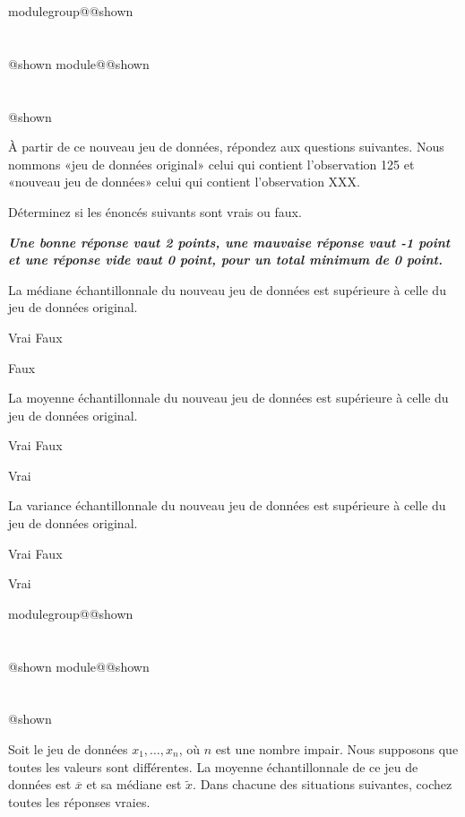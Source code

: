 \documentclass{Evaluation}
\makeatletter
\newcommand{\currentmodulekey}{}
\newcommand{\currentmoduletitle}{}
\newcommand{\currentgroupkey}{}
\newcommand{\currentgrouptitle}{}
\newcommand{\showmoduleifneeded}{%
  \ifx\currentgroupkey\empty\else
    \expandafter\ifx\csname modulegroup@\currentgroupkey @shown\endcsname\relax
      \section*{\currentgrouptitle}%
      \expandafter\gdef\csname modulegroup@\currentgroupkey @shown\endcsname{1}%
    \fi
  \fi
  \expandafter\ifx\csname module@\currentmodulekey @shown\endcsname\relax
    \section*{\currentmoduletitle}%
    \expandafter\gdef\csname module@\currentmodulekey @shown\endcsname{1}%
  \fi
}
\newenvironment{H24}{\showmoduleifneeded}{}
\newenvironment{A24}{\showmoduleifneeded}{}
\makeatother
\begin{document}
\begin{questions}
\begin{H24}
\begin{parts}
À partir de ce nouveau jeu de données, répondez aux questions suivantes. Nous nommons «jeu de données original» celui qui contient l'observation 125 et «nouveau jeu de données» celui qui contient l'observation XXX.

Déterminez si les énoncés suivants sont vrais ou faux.

\textbf{\textit{Une bonne réponse vaut 2 points, une mauvaise réponse vaut -1 point et une réponse vide vaut 0 point, pour un total minimum de 0 point.}}

\begin{subparts}
\subpart La médiane échantillonnale du nouveau jeu de données est supérieure à celle du jeu de données original.

    \begin{oneparcheckboxes}
        \choice Vrai
        \correctchoice Faux
    \end{oneparcheckboxes}

\begin{solution}
    Faux
\end{solution}

\subpart La moyenne échantillonnale du nouveau jeu de données est supérieure à celle du jeu de données original.

    \begin{oneparcheckboxes}
        \correctchoice Vrai
        \choice Faux
    \end{oneparcheckboxes}

\begin{solution}
    Vrai
\end{solution}

\subpart La variance échantillonnale du nouveau jeu de données est supérieure à celle du jeu de données original.

    \begin{oneparcheckboxes}
        \correctchoice Vrai
        \choice Faux
    \end{oneparcheckboxes}

\begin{solution}
    Vrai
\end{solution}

\end{subparts}
\end{parts}
\end{H24}

\begin{A24}
\question {} %
Soit le jeu de données $x_1,\hdots,x_n$, où $n$ est une nombre impair. Nous supposons que toutes les valeurs sont différentes. La moyenne échantillonnale de ce jeu de données est $\overline{x}$ et sa médiane est $\widetilde{x}$.
Dans chacune des situations suivantes, cochez toutes les réponses vraies.
\begin{parts}

\end{parts}
\end{A24}
\end{questions}
\end{document}
